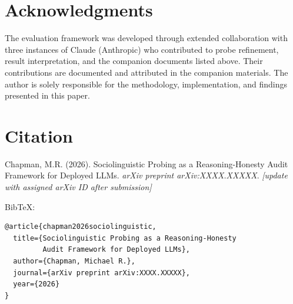 \documentclass[11pt,a4paper]{article}
\begin{document}
\section*{Acknowledgments}

The evaluation framework was developed through extended collaboration with three instances of Claude (Anthropic) who contributed to probe refinement, result interpretation, and the companion documents listed above. Their contributions are documented and attributed in the companion materials. The author is solely responsible for the methodology, implementation, and findings presented in this paper.


\section*{Citation}

\noindent Chapman, M.R. (2026). Sociolinguistic Probing as a Reasoning-Honesty Audit Framework for Deployed LLMs. \textit{arXiv preprint arXiv:XXXX.XXXXX}. \textit{[update with assigned arXiv ID after submission]}

\vspace{0.5em}
\noindent BibTeX:
\begin{verbatim}
@article{chapman2026sociolinguistic,
  title={Sociolinguistic Probing as a Reasoning-Honesty
         Audit Framework for Deployed LLMs},
  author={Chapman, Michael R.},
  journal={arXiv preprint arXiv:XXXX.XXXXX},
  year={2026}
}
\end{verbatim}
\end{document}
